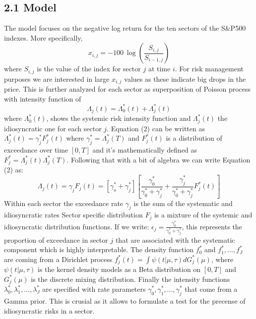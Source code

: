 \documentclass[fleqn, a4paper]{report}
\begin{document}
\subsection*{2.1 Model}
The model focuses on the negative log return for the ten sectors of the S\&P500 indexes. More specifically, 
\begin{equation}
x_{i,j} = -100~\log(\frac{S_{i,j}}{S_{i-1,j}})
\end{equation}
where $S_{i,j}$ is the value of the index for sector $j$ at time $i$. For risk management purposes we are interested in large $x_{i,j}$ values as these indicate big drops in the price. This is further analyzed for each sector as superposition of Poisson process with intensity function of 
\begin{equation}
\Lambda_j(t) = \Lambda_0^*(t) + \Lambda_j^*(t)
\end{equation}
where $\Lambda_0^*(t)$, shows the systemic risk intensity function and $\Lambda_j^*(t)$ the idiosyncratic one for each sector $j$. Equation (2) can be written as $\Lambda_j^*(t) = \gamma_j^*F_j^*(t)$ where $\gamma_j^* = \Lambda_j^*(T)$ and $F_j^*(t)$ is a distribution of exceedance over time $[0,T]$ and it's mathematically defined as $F_j^* = {\Lambda_j^*(t)}{\Lambda_j^*(T)}$. Following that with a bit of algebra we can write Equation (2) as:
\begin{equation}
\Lambda_j(t) = \gamma_jF_j(t) = [\gamma_o^* + \gamma_j^*][\frac{\gamma_0^*}{\gamma_0^* +\gamma_j^*} + \frac{\gamma_j^*}{\gamma_0^* +\gamma_j^*}F_j^*(t)]
\end{equation}
Within each sector the exceedance rate $\gamma_j$ is the sum of the systematic and idiosyncratic rates
Sector specific distribution $F_j$ is a mixture of the systemic and idiosyncratic distribution functions.
If we write: $\epsilon_j=\frac{\gamma_0^*}{\gamma_0^* +\gamma_j^*}$, this represents the proportion of exceedance in sector $j$  that are associated with the systematic component which is highly interpretable. The density function $f_0^*$ and $f_1^*, ..., f_J^*$ are coming from a Dirichlet process $f_j^*(t) = \int\psi(t|\mu, \tau)dG_j^*(\mu)$, where $\psi(t|\mu, \tau)$ is the kernel density models as a Beta distribution on $[0,T]$ and $G_j^*(\mu)$ is the discrete mixing distribution. Finally the intensity functions $\lambda_0^*, \lambda_1^*, ..., \lambda_J^*$ are specified with rate parameters $\gamma_0^*, \gamma_1^*,...,\gamma_j^*$ that come from a Gamma prior. This is crusial as it allows to formulate a test for the precense of idiosyncratic risks in a sector. 
\end{document}
